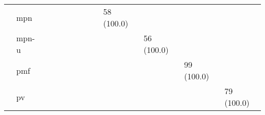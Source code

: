 \begin{tabular}{lllllllllllll}
                 & mpn &                      &                     &                    &                      &                     &                   &                   &        58 (100.0) &                      &                     &                      \\
                 & mpn-u &                      &                     &                    &                      &                     &                   &                   &                   &           56 (100.0) &                     &                      \\
                 & pmf &                      &                     &                    &                      &                     &                   &                   &                   &                      &          99 (100.0) &                      \\
                 & pv &                      &                     &                    &                      &                     &                   &                   &                   &                      &                     &           79 (100.0) \\
\bottomrule
\end{tabular}

